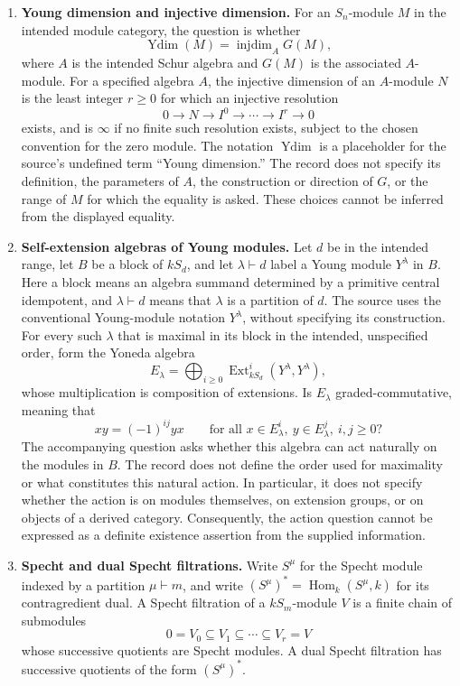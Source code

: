 \documentclass[11pt]{article}
\begin{document}
\begin{enumerate}
\item \textbf{Young dimension and injective dimension.} For an \(S_n\)-module \(M\) in the intended module category, the question is whether
\[
\operatorname{Ydim}(M)=\operatorname{injdim}_{A}G(M),
\]
where \(A\) is the intended Schur algebra and \(G(M)\) is the associated \(A\)-module. For a specified algebra \(A\), the injective dimension of an \(A\)-module \(N\) is the least integer \(r\geq 0\) for which an injective resolution
\[
0\longrightarrow N\longrightarrow I^0\longrightarrow \cdots\longrightarrow I^r\longrightarrow 0
\]
exists, and is \(\infty\) if no finite such resolution exists, subject to the chosen convention for the zero module. The notation \(\operatorname{Ydim}\) is a placeholder for the source's undefined term ``Young dimension.'' The record does not specify its definition, the parameters of \(A\), the construction or direction of \(G\), or the range of \(M\) for which the equality is asked. These choices cannot be inferred from the displayed equality.

\item \textbf{Self-extension algebras of Young modules.} Let \(d\) be in the intended range, let \(B\) be a block of \(kS_d\), and let \(\lambda\vdash d\) label a Young module \(Y^\lambda\) in \(B\). Here a block means an algebra summand determined by a primitive central idempotent, and \(\lambda\vdash d\) means that \(\lambda\) is a partition of \(d\). The source uses the conventional Young-module notation \(Y^\lambda\), without specifying its construction. For every such \(\lambda\) that is maximal in its block in the intended, unspecified order, form the Yoneda algebra
\[
E_\lambda=\bigoplus_{i\geq 0}\operatorname{Ext}^{i}_{kS_d}(Y^\lambda,Y^\lambda),
\]
whose multiplication is composition of extensions. Is \(E_\lambda\) graded-commutative, meaning that
\[
xy=(-1)^{ij}yx
\qquad
\text{for all }x\in E_\lambda^i,\ y\in E_\lambda^j,\ i,j\geq 0?
\]
The accompanying question asks whether this algebra can act naturally on the modules in \(B\). The record does not define the order used for maximality or what constitutes this natural action. In particular, it does not specify whether the action is on modules themselves, on extension groups, or on objects of a derived category. Consequently, the action question cannot be expressed as a definite existence assertion from the supplied information.

\item \textbf{Specht and dual Specht filtrations.} Write \(S^\mu\) for the Specht module indexed by a partition \(\mu\vdash m\), and write \((S^\mu)^*=\operatorname{Hom}_k(S^\mu,k)\) for its contragredient dual. A Specht filtration of a \(kS_m\)-module \(V\) is a finite chain of submodules
\[
0=V_0\subseteq V_1\subseteq\cdots\subseteq V_r=V
\]
whose successive quotients are Specht modules. A dual Specht filtration has successive quotients of the form \((S^\mu)^*\).


\end{enumerate}
\end{document}
